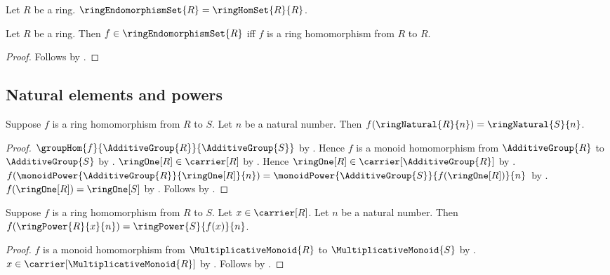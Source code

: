 \begin{definition}\label{ring_endomorphism_set}
    Let $R$ be a ring.
    $\ringEndomorphismSet{R}=\ringHomSet{R}{R}$.
\end{definition}

\begin{proposition}\label{ring_endomorphism_set_iff}
    Let $R$ be a ring.
    Then $f\in\ringEndomorphismSet{R}$ iff
        $f$ is a ring homomorphism from $R$ to $R$.
\end{proposition}
\begin{proof}
    Follows by
        .
\end{proof}

\subsection{Natural elements and powers}

\begin{theorem}\label{ring_hom_preserves_natural}
    Suppose $f$ is a ring homomorphism from $R$ to $S$.
    Let $n$ be a natural number.
    Then $f(\ringNatural{R}{n})=\ringNatural{S}{n}$.
\end{theorem}
\begin{proof}
    $\groupHom{f}{\AdditiveGroup{R}}{\AdditiveGroup{S}}$ by
        .
    Hence $f$ is a monoid homomorphism from $\AdditiveGroup{R}$ to
        $\AdditiveGroup{S}$ by .
    $\ringOne[R]\in\carrier[R]$ by
        .
    Hence $\ringOne[R]\in\carrier[\AdditiveGroup{R}]$ by
        .
    $f(\monoidPower{\AdditiveGroup{R}}{\ringOne[R]}{n})=
        \monoidPower{\AdditiveGroup{S}}{f(\ringOne[R])}{n}$ by
        .
    $f(\ringOne[R])=\ringOne[S]$ by .
    Follows by .
\end{proof}

\begin{theorem}\label{ring_hom_preserves_power}
    Suppose $f$ is a ring homomorphism from $R$ to $S$.
    Let $x\in\carrier[R]$.
    Let $n$ be a natural number.
    Then $f(\ringPower{R}{x}{n})=\ringPower{S}{f(x)}{n}$.
\end{theorem}
\begin{proof}
    $f$ is a monoid homomorphism from $\MultiplicativeMonoid{R}$ to
        $\MultiplicativeMonoid{S}$ by
        .
    $x\in\carrier[\MultiplicativeMonoid{R}]$ by
        .
    Follows by
        .
\end{proof}

